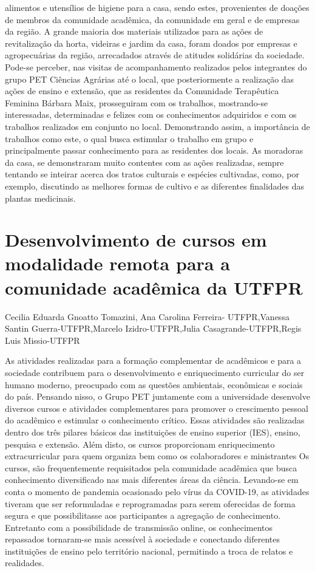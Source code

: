 alimentos e utensílios de higiene para a casa, sendo estes, provenientes de doações de membros
da comunidade acadêmica, da comunidade em geral e de empresas da região. A grande maioria
dos materiais utilizados para as ações de revitalização da horta, videiras e jardim da casa, foram
doados por empresas e agropecuárias da região, arrecadados através de atitudes solidárias da
sociedade.
Pode-se perceber, nas visitas de acompanhamento realizados pelos integrantes do grupo
PET Ciências Agrárias até o local, que posteriormente a realização das ações de ensino e
extensão, que as residentes da Comunidade Terapêutica Feminina Bárbara Maix, prosseguiram
com os trabalhos, mostrando-se interessadas, determinadas e felizes com os conhecimentos
adquiridos e com os trabalhos realizados em conjunto no local. Demonstrando assim, a
importância de trabalhos como este, o qual busca estimular o trabalho em grupo e principalmente
passar conhecimento para as residentes dos locais. As moradoras da casa, se demonstraram
muito contentes com as ações realizadas, sempre tentando se inteirar acerca dos tratos culturais e
espécies cultivadas, como, por exemplo, discutindo as melhores formas de cultivo e as diferentes
finalidades das plantas medicinais.



\section{Desenvolvimento de cursos em modalidade remota para a comunidade acadêmica da UTFPR }

Cecilia Eduarda Gnoatto Tomazini, Ana Carolina Ferreira- UTFPR,Vanessa Santin Guerra-UTFPR,Marcelo Izidro-UTFPR,Julia Casagrande-UTFPR,Regis Luis Missio-UTFPR

As atividades realizadas para a formação complementar de acadêmicos e para a sociedade contribuem para o desenvolvimento e enriquecimento curricular do ser humano moderno, preocupado com as questões ambientais, econômicas e sociais do país. Pensando nisso, o Grupo PET juntamente com a universidade desenvolve diversos cursos e atividades complementares para promover o crescimento pessoal do acadêmico e estimular o conhecimento crítico. Essas atividades são realizadas dentro dos três pilares básicos das instituições de ensino superior (IES), ensino, pesquisa e extensão. Além disto, os cursos proporcionam enriquecimento extracurricular para quem organiza bem como os colaboradores e ministrantes Os cursos, são frequentemente requisitados pela comunidade acadêmica que busca conhecimento diversificado nas mais diferentes áreas da ciência. Levando-se em conta o momento de pandemia ocasionado pelo vírus da COVID-19, as atividades tiveram que ser reformuladas e reprogramadas para serem oferecidas de forma segura e que possibilitasse aos participantes a agregação de conhecimento. Entretanto com a possibilidade de transmissão online, os conhecimentos repassados tornaram-se mais acessível à sociedade e conectando diferentes instituições de ensino pelo território nacional, permitindo a troca de relatos e realidades.

